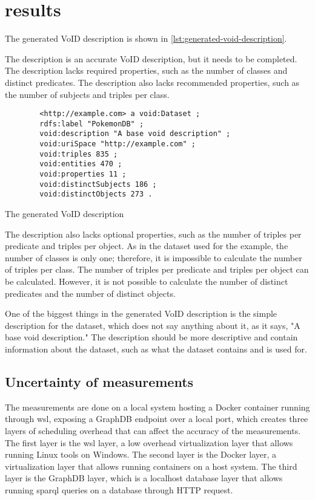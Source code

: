 \section{results}\label{sec:results}
The generated VoID description is shown in \autoref{lst:generated-void-description}.

The description is an accurate VoID description, but it needs to be completed. The description lacks required properties, such as the number of classes and distinct predicates. The description also lacks recommended properties, such as the number of subjects and triples per class.

\begin{listing}[!ht]
    \begin{verbatim}          
        <http://example.com> a void:Dataset ;
        rdfs:label "PokemonDB" ;
        void:description "A base void description" ;
        void:uriSpace "http://example.com" ;
        void:triples 835 ;
        void:entities 470 ;
        void:properties 11 ;
        void:distinctSubjects 186 ;
        void:distinctObjects 273 .
    \end{verbatim}
    \caption{The generated VoID description}
    \label{lst:generated-void-description}
\end{listing}

The description also lacks optional properties, such as the number of triples per predicate and triples per object. As in the dataset used for the example, the number of classes is only one; therefore, it is impossible to calculate the number of triples per class. The number of triples per predicate and triples per object can be calculated. However, it is not possible to calculate the number of distinct predicates and the number of distinct objects.

One of the biggest things in the generated VoID description is the simple description for the dataset, which does not say anything about it, as it says, "A base void description." The description should be more descriptive and contain information about the dataset, such as what the dataset contains and is used for.

\subsection{Uncertainty of measurements}\label{subsec:uncertainty-of-measurements}
The measurements are done on a local system hosting a Docker container running through \gls{wsl}, exposing a GraphDB endpoint over a local port, which creates three layers of scheduling overhead that can affect the accuracy of the measurements. The first layer is the \gls{wsl} layer, a low overhead virtualization layer that allows running Linux tools on Windows. The second layer is the Docker layer, a virtualization layer that allows running containers on a host system. The third layer is the GraphDB layer, which is a localhost database layer that allows running \gls{sparql} queries on a database through HTTP request.




